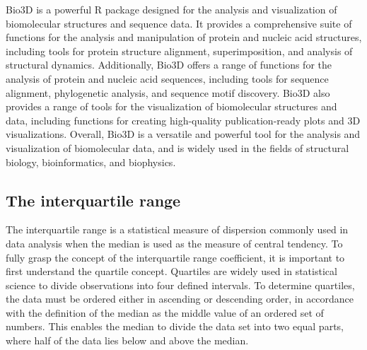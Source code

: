 \documentclass[
  letterpaper,
  DIV=11,
  numbers=noendperiod]{scrreprt}
\begin{document}
\begin{tcolorbox}[enhanced jigsaw, arc=.35mm, breakable, toptitle=1mm, opacityback=0, bottomrule=.15mm, toprule=.15mm, rightrule=.15mm, titlerule=0mm, opacitybacktitle=0.6, coltitle=black, left=2mm, title=\textcolor{quarto-callout-note-color}{\faInfo}\hspace{0.5em}{Methods: bio3d R package}, bottomtitle=1mm, leftrule=.75mm, colback=white, colbacktitle=quarto-callout-note-color!10!white, colframe=quarto-callout-note-color-frame]

Bio3D is a powerful R package designed for the analysis and
visualization of biomolecular structures and sequence data. It provides
a comprehensive suite of functions for the analysis and manipulation of
protein and nucleic acid structures, including tools for protein
structure alignment, superimposition, and analysis of structural
dynamics. Additionally, Bio3D offers a range of functions for the
analysis of protein and nucleic acid sequences, including tools for
sequence alignment, phylogenetic analysis, and sequence motif discovery.
Bio3D also provides a range of tools for the visualization of
biomolecular structures and data, including functions for creating
high-quality publication-ready plots and 3D visualizations. Overall,
Bio3D is a versatile and powerful tool for the analysis and
visualization of biomolecular data, and is widely used in the fields of
structural biology, bioinformatics, and biophysics.

\end{tcolorbox}

\hypertarget{the-interquartile-range}{%
\subsection{\texorpdfstring{\textbf{The interquartile
range}}{The interquartile range}}\label{the-interquartile-range}}

The interquartile range is a statistical measure of dispersion commonly
used in data analysis when the median is used as the measure of central
tendency. To fully grasp the concept of the interquartile range
coefficient, it is important to first understand the quartile concept.
Quartiles are widely used in statistical science to divide observations
into four defined intervals. To determine quartiles, the data must be
ordered either in ascending or descending order, in accordance with the
definition of the median as the middle value of an ordered set of
numbers. This enables the median to divide the data set into two equal
parts, where half of the data lies below and above the median.
\end{document}
